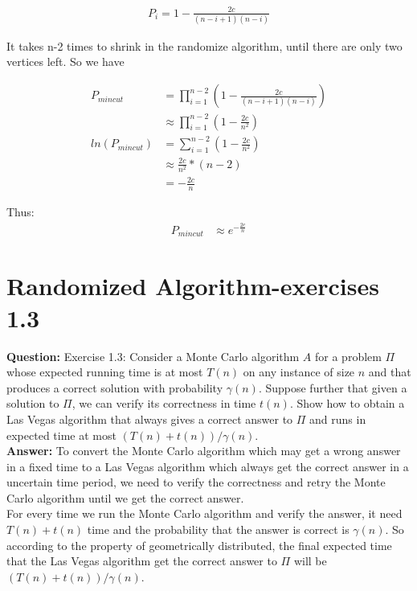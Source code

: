 \documentclass[12pt]{article}
\begin{document}
\begin{equation}
\begin{aligned}
P_i = 1 - \frac{2c}{(n-i+1)(n-i)}
\end{aligned}
\end{equation}

It takes n-2 times to shrink in the randomize algorithm, until there are only two vertices left. So we have

\begin{equation}
\begin{aligned}
P_{mincut} &= \prod_{i=1}^{n-2} (1 - \frac{2c}{(n-i+1)(n-i)})\\
&\approx  \prod_{i=1}^{n-2} (1 - \frac{2c}{n^2})\\
ln(P_{mincut}) &= \sum_{i=1}^{n-2} (1 - \frac{2c}{n^2})\\
&\approx  \frac{2c}{n^2} * (n-2)\\
&= -\frac{2c}{n}
\end{aligned}
\end{equation}

Thus:
\begin{equation}
\begin{aligned}
P_{mincut} &\approx  e^{-\frac{2c}{n}}
\end{aligned}
\end{equation}


\section{Randomized Algorithm-exercises 1.3}
\textbf{Question:}
Exercise 1.3: Consider a Monte Carlo algorithm $A$ for a problem $\Pi$ whose expected running time is at most $T(n)$ on any instance of size $n$ and that produces a correct solution with probability $\gamma(n)$. Suppose further that given a solution to $\Pi$, we can verify its correctness in time $t(n)$. Show how to obtain a Las Vegas algorithm that always gives a correct answer to $\Pi$ and runs in expected time at most $(T(n) + t(n))/\gamma(n)$.\\
\textbf{Answer:}
To convert the Monte Carlo algorithm which may get a wrong answer in a fixed time to a Las Vegas algorithm which always get the correct answer in a uncertain time period, we need to verify the correctness and retry the Monte Carlo algorithm until we get the correct answer.\\
For every time we run the Monte Carlo algorithm and verify the answer, it need $T(n) + t(n)$ time and the probability that the answer is correct is $\gamma(n)$. So according to the property of geometrically distributed, the final expected time that the Las Vegas algorithm get the correct answer to $\Pi$ will be $(T(n) + t(n))/\gamma(n)$.
\end{document}
